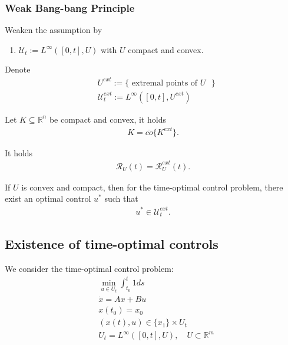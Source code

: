 \subsubsection{Weak Bang-bang Principle}
Weaken the assumption by
\begin{enumerate}
	\item $\mathcal{U}_t:= L^\infty([0, t], U)$ with $U$ compact and convex. 
\end{enumerate}
Denote 
\begin{align*}
	& U^{ext}:= \{\text{ extremal points of $U$ }\}\\
	& \mathcal{U}_t^{ext}:= L^\infty([0, t], U^{ext})
\end{align*}

\begin{lemma}
	Let $K \subseteq \mathbb{R}^n$ be compact and convex, it holds
	\begin{align*}
		K = \overline{co}\{K^{ext}\}. 
	\end{align*}
\end{lemma}

\begin{theorem}
	It holds
	\begin{align*}
		\mathcal{R}_U(t) = \mathcal{R}_U^{ext}(t).
	\end{align*}
\end{theorem}

\begin{corollary}
	If $U$ is convex and compact, then for the time-optimal control problem, there exist an optimal control $u^*$ such that 
	\begin{align*}
		u^* \in \mathcal{U}^{ext}_t. 
	\end{align*}
\end{corollary}



\subsection{Existence of time-optimal controls}
We consider the time-optimal control problem:
\begin{align*}
	& \min_{u \in U_{t}} \int_{t_0}^{t} 1 ds\\
	& \dot{x} = A x + Bu\\
	& x(t_0) = x_0\\
	& (x(t), u) \in \{x_1\} \times  U_t\\
	& U_t =  L^\infty([0, t], U), \quad U \subset \mathbb{R}^m 
\end{align*}


